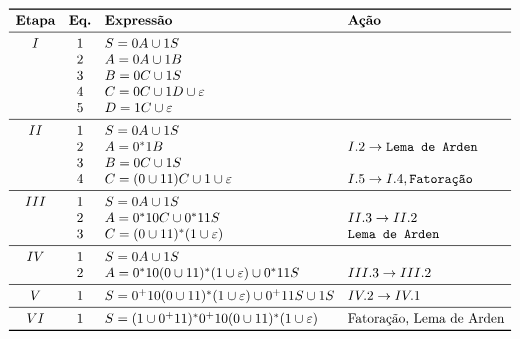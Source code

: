 \documentclass[12pt]{article}
\newcommand{\ve}{\ensuremath{\varepsilon}}
\begin{document}
\begin{tcolorbox}[breakable,rounded corners, colback=yellow!5, colframe=red!40!black, title={Extração de expressão regular $\mathcal{R}_1$ da gramática $G$, tal que $\mathcal{L}(\mathcal{R}_1)=\mathcal{L}(G_1)$}]
  $$
  \begin{array}{ccll}
  \toprule
  \textbf{Etapa} & \textbf{Eq.} & \textbf{Expressão} & \textbf{Ação}\\
  \midrule
    I & 1 & S = 0A \cup 1S           &\\
      & 2 & A = 0A \cup 1B           &\\
      & 3 & B = 0C \cup 1S           &\\
      & 4 & C = 0C \cup 1D  \cup \ve &\\
      & 5 & D = 1C \cup \ve          &\\
  \midrule
   II & 1 & S = 0A \cup 1S                 &\\
      & 2 & A = 0^*1B                      & I.2 \to \texttt{Lema de Arden}\\
      & 3 & B = 0C \cup 1S                 &\\
      & 4 & C = (0\cup 11)C \cup 1\cup \ve & I.5 \to I.4, \texttt{Fatoração}\\
  \midrule
  III & 1 & S = 0A \cup 1S              &\\
      & 2 & A = 0^*10C\cup 0^*11S       & II.3 \to II.2\\
      & 3 & C = (0\cup 11)^*(1\cup \ve) & \texttt{Lema de Arden}\\
  \midrule
   IV & 1 & S = 0A \cup 1S                              &\\
      & 2 & A = 0^*10(0\cup 11)^*(1\cup \ve)\cup 0^*11S & III.3 \to III.2\\
  \midrule
    V & 1 & S = 0^+10(0\cup 11)^*(1\cup \ve)\cup 0^+11S \cup 1S & IV.2 \to IV.1\\
  \midrule
   VI & 1 & S = (1\cup 0^+11)^*0^+10(0\cup 11)^*(1\cup \ve) & \text{Fatoração, Lema de Arden}\\
  \bottomrule
  \end{array}
  $$
\end{tcolorbox}\bigskip
\end{document}
